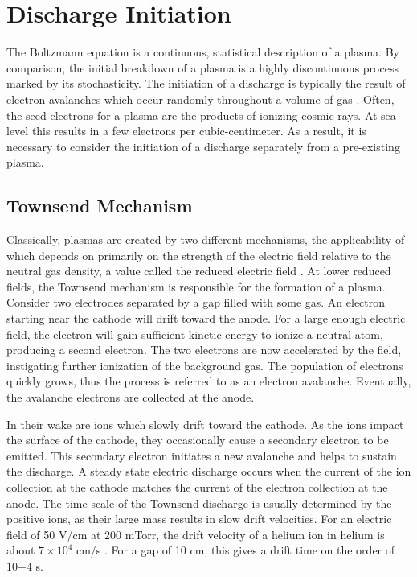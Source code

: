 \section{Discharge Initiation}
The Boltzmann equation is a continuous, statistical description of a plasma. By
comparison, the initial breakdown of a plasma is a highly discontinuous process
marked by its stochasticity. The initiation of a discharge is typically the
result of electron avalanches which occur randomly throughout a volume of gas
\cite{Druyvesteyn1940}. Often, the seed electrons for a plasma are the products
of ionizing cosmic rays. At sea level this results in a few electrons per
cubic-centimeter. As a result, it is necessary to consider the initiation of a
discharge separately from a pre-existing plasma.

\subsection{Townsend Mechanism}

Classically, plasmas are created by two different mechanisms, the applicability
of which depends on primarily on the strength of the electric field relative to
the neutral gas density, a value called the reduced electric field
\cite{Huxley1966}. At lower reduced fields, the Townsend mechanism is
responsible for the formation of a plasma. Consider two electrodes separated by
a gap filled with some gas. An electron starting near the cathode will drift
toward the anode. For a large enough electric field, the electron will gain
sufficient kinetic energy to ionize a neutral atom, producing a second electron.
The two electrons are now accelerated by the field, instigating further
ionization of the background gas. The population of electrons quickly grows,
thus the process is referred to as an electron avalanche. Eventually, the
avalanche electrons are collected at the anode.

In their wake are ions which slowly drift toward the cathode. As the ions impact
the surface of the cathode, they occasionally cause a secondary electron to be
emitted. This secondary electron initiates a new avalanche and helps to sustain
the discharge. A steady state electric discharge occurs when the current of the
ion collection at the cathode matches the current of the electron collection at
the anode. The time scale of the Townsend discharge is usually determined by the
positive ions, as their large mass results in slow drift velocities. For an
electric field of 50 V/cm at 200 mTorr, the drift velocity of a helium ion in
helium is about $7\times10^4$ cm/s \cite{Hornbeck1951}. For a gap of 10 cm, this
gives a drift time on the order of $10{-4}$ s.

